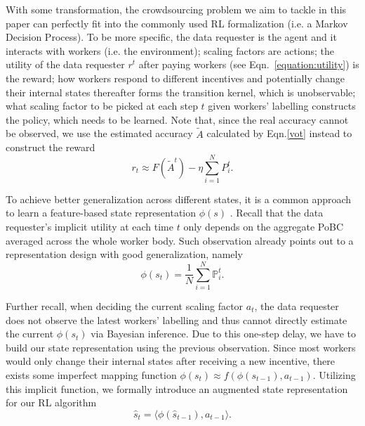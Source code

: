 With some transformation, the  crowdsourcing problem we aim to tackle in this paper can perfectly fit into the commonly used RL formalization (i.e. a Markov Decision Process). To be more specific, the data requester is the agent and it interacts with workers (i.e. the environment); scaling factors are actions; the utility of the data requester $r^t$ after paying workers (see Eqn.~\ref{equation:utility}) is the reward; how workers respond to different incentives and potentially change their internal states thereafter forms the transition kernel, which is unobservable; what scaling factor to be picked at each step $t$ given workers' labelling constructs the policy, which needs to be learned. Note that, since the real accuracy cannot be observed, we use the estimated accuracy $\tilde{A}$ calculated by Eqn.\ref{vot} instead to construct the reward
\begin{equation}
\label{equation:approx_reward}
r_t\approx F(\tilde{A}^t) - \eta {\sum}_{i=1}^{N}P^t_i.
\end{equation}

To achieve better generalization across different states, it is a common approach to learn a feature-based state representation $\phi(s)$ \citep{Gordon00, Mnih15, Liang16}. Recall that the data requester's implicit utility at each time $t$ only depends on the aggregate PoBC averaged across the whole worker body. Such observation already points out to a  representation design with good generalization, namely 
$$\phi(s_t) = \frac{1}{N}\sum_{i=1}^N \mathbb{P}^t_i.$$

Further recall, when deciding the current scaling factor $a_t$, the data requester does not observe the latest workers' labelling and thus cannot directly estimate the current $\phi(s_t)$ via Bayesian inference. Due to this one-step delay, we have to build our state representation using the previous observation. Since most workers would only change their internal states after receiving a new incentive, there exists some imperfect mapping function $\phi(s_{t}) \approx f(\phi(s_{t-1}),a_{t-1})$. %
Utilizing this implicit function, we formally introduce an augmented state representation for our RL algorithm
$$
\hat{s}_t = \langle \phi(\hat{s}_{t-1}), a_{t-1} \rangle .
$$


